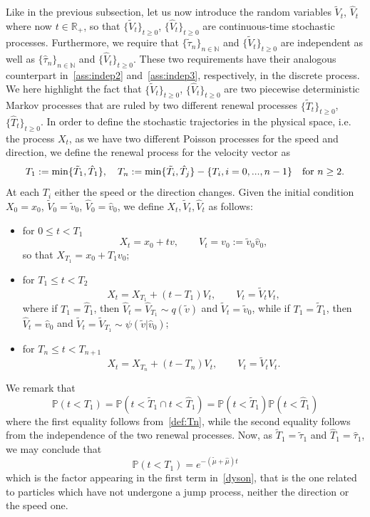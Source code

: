 \documentclass[a4paper]{article}
\theoremstyle{Theorem}\newtheorem{proposition}{Proposition}[section]
\theoremstyle{Remark}\newtheorem{remark}{Remark}[section]
\theoremstyle{Theorem}\newtheorem{theorem}{Theorem}[section]
\newcommand{\R}{\mathbb{R}}
\newcommand{\hv}{\hat{v}}
\newcommand{\tv}{\tilde{v}}
\newcommand{\hV}{\hat{V}}
\newcommand{\tV}{\tilde{V}}
\newcommand{\hmu}{\hat{\mu}}
\newcommand{\tmu}{\tilde{\mu}}
\begin{document}
Like in the previous subsection, let us now introduce the random variables $\tV_t$, $\hV_t$ where now ${t \in \R_+}$, so that $\lbrace \tV_t \rbrace_{t\ge 0}$, $\lbrace \hV_t\rbrace_{t\ge 0}$ are continuous-time stochastic processes. Furthermore, we require that $\lbrace \tilde{\tau}_n \rbrace_{n \in \mathbb{N}}$ and $\lbrace \tV_t\rbrace_{t\ge 0}$ are independent as well as $\lbrace \hat{\tau}_n\rbrace_{n \in \mathbb{N}}$ and  $\lbrace \hV_t \rbrace_{t\ge 0}$. These two requirements have their analogous counterpart in~\eqref{ass:indep2} and~\eqref{ass:indep3}, respectively, in the discrete process. 
We here highlight the fact that $\lbrace \tV_t \rbrace_{t\ge 0}$, $\lbrace \hV_t\rbrace_{t\ge 0}$ are two piecewise deterministic Markov processes that are ruled by two different %
renewal processes  $\lbrace \tilde{T}_t \rbrace_{t\ge 0}$, $\lbrace \hat{T}_t\rbrace_{t\ge 0}$.
In order to define the stochastic trajectories in the physical space, i.e. the process $X_t$, as we have two different Poisson processes for the speed and direction, we define the renewal process for the velocity vector as
\begin{equation}\label{def:Tn}
    T_1 := \min \lbrace \tilde{T}_1, \hat{T}_1\rbrace, \quad T_n := \min\lbrace \tilde{T}_i, \hat{T}_j \rbrace - \lbrace T_i, i=0,...,n-1\rbrace  \quad {\rm for } \, \, n\ge 2.
\end{equation}
At each $T_i$ either the speed or the direction changes.
Given the initial condition $X_0=x_0$, $\tV_0=\tv_0$, $\hV_0=\hv_0$, we define $X_t,\tV_t,\hV_t$ as follows:
\begin{itemize}
    \item[-] for $0\le t <T_1$
    \[
    X_t=x_0+tv, \qquad V_t=v_0 := \tv_0\hv_0,
    \]
    so that $X_{T_1}=x_0+T_1v_0$;
    \item[-] for $T_1\le t <T_2$
    \[
    X_t=X_{T_1}+(t-T_1)V_t, \qquad V_t = \tV_t \hV_t,
    \]
    where if $T_1=\hat{T}_1$, then $\hV_t=\hV_{T_1} \sim q(\tv)$ and $\tV_t=\tv_0$, while if $T_1=\tilde{T}_1$, then $\hV_t=\hv_0$ and $\tV_t=\tV_{T_1} \sim \psi(\tv|\hv_0)$;
    \item[-] for $T_n \le t < T_{n+1}$
    \[
    X_t=X_{T_n}+(t-T_n)V_t, \qquad V_t = \tV_t \hV_t.
    \]
\end{itemize}
We remark that 
\[
\mathbb{P}(t <T_1)= \mathbb{P}(t<\tilde{T}_1 \cap t< \hat{T}_1)= \mathbb{P}(t<\tilde{T}_1) \mathbb{P}(t<\hat{T}_1)
\]
where the first equality follows from~\eqref{def:Tn}, while the second equality follows from the independence of the two renewal processes. 
Now, as $\tilde{T}_1=\tilde{\tau}_1$ and $\hat{T}_1=\hat{\tau}_1$, we may conclude that
\[
\mathbb{P}(t <T_1)=e^{-(\tmu+\hmu)t}
\]
which is the factor appearing in the first term in~\eqref{dyson}, that is the one related to particles which have not undergone a jump process, neither the direction or the speed one. 
\end{document}
